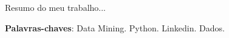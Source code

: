 \begin{resumo}[RESUMO]
	 Resumo do meu trabalho...
	   

 \vspace{\onelineskip}
    
 \noindent
 \textbf{Palavras-chaves}: Data Mining. Python. Linkedin. Dados.
\end{resumo}
